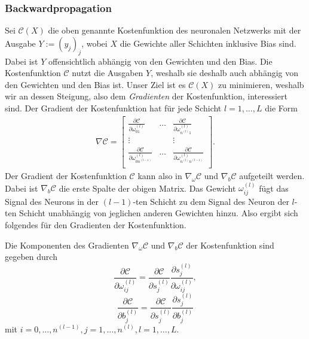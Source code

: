 \subsubsection{Backwardpropagation}
Sei $\mathcal{C}(X)$ die oben genannte Kostenfunktion des neuronalen Netzwerks mit der Ausgabe
$Y:=(y_j)_j$, wobei $X$ die Gewichte aller Schichten inklusive Bias sind. Dabei ist $Y$ offensichtlich
abhängig von den Gewichten und den Bias. Die Kostenfunktion $\mathcal{C}$ nutzt die Ausgaben $Y$, weshalb sie deshalb
auch abhängig von den Gewichten und den Bias ist. Unser Ziel ist es $\mathcal{C}(X)$ zu minimieren, weshalb wir an dessen
Steigung, also dem \textit{Gradienten} der Kostenfunktion, interessiert sind. Der Gradient der Kostenfunktion hat für
jede Schicht $l = 1, \dots, L$ die Form
\begin{align*}
    \nabla\mathcal{C}=
        \begin{bmatrix}
            \frac{\partial \mathcal{C}}{\partial \omega_{01}^{(l)}} & \dots &
            \frac{\partial \mathcal{C}}{\partial \omega_{n^{(l)}1}^{(l)}} \\
            \vdots & & \vdots \\
            \frac{\partial \mathcal{C}}{\partial \omega_{0n^{(l-1)}}^{(l)}} & \dots &
            \frac{\partial \mathcal{C}}{\partial \omega_{n^{(l)}n^{(l-1)}}^{(l)}} \\
        \end{bmatrix}.
\end{align*}
Der Gradient der Kostenfunktion $\mathcal{C}$ kann also in $\nabla_{\omega}\mathcal{C}$ und $\nabla_{b}\mathcal{C}$ aufgeteilt werden.
Dabei ist $\nabla_{b}\mathcal{C}$ die erste Spalte der obigen Matrix. Das Gewicht $\omega_{ij}^{(l)}$ fügt das Signal des Neurons
in der $(l-1)$-ten Schicht zu dem Signal des Neuron der $l$-ten Schicht unabhängig von jeglichen anderen Gewichten hinzu.
Also ergibt sich folgendes für den Gradienten der Kostenfunktion.
\begin{satz}
    \label{machine-cost-grad}
    Die Komponenten des Gradienten $\nabla_{\omega}\mathcal{C}$ und $\nabla_{b}\mathcal{C}$ der Kostenfunktion sind
    gegeben durch
    \[
        \frac{\partial \mathcal{C}}{\partial \omega_{ij}^{(l)}} = \frac{\partial \mathcal{C}}{\partial s_{j}^{(l)}} \frac{\partial s_{j}^{(l)}}{\partial \omega_{ij}^{(l)}},
    \]
    \[
        \frac{\partial \mathcal{C}}{\partial b_{j}^{(l)}} = \frac{\partial \mathcal{C}}{\partial s_{j}^{(l)}} \frac{\partial s_{j}^{(l)}}{\partial b_j^{(l)}}
    \]
    mit $i = 0, \dots, n^{(l-1)}, j= 1, \dots,  n^{(l)}, l=1, \dots, L$.
\end{satz}

